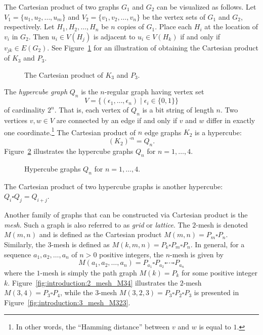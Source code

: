 The Cartesian product of two graphs $G_1$ and $G_2$ can be visualized
as follows. Let $V_1 = \{u_1, u_2, \dots, u_m\}$ and
$V_2 = \{v_1, v_2, \dots, v_n\}$ be the vertex sets of $G_1$ and
$G_2$, respectively. Let $H_1, H_2, \dots, H_n$ be $n$ copies of
$G_1$. Place each $H_i$ at the location of $v_i$ in $G_2$. Then
$u_i \in V(H_j)$ is adjacent to $u_i \in V(H_k)$ if and only if
$v_{jk} \in E(G_2)$. See
Figure~\ref{fig:introduction:Cartesian_product_K3_P3} for an
illustration of obtaining the Cartesian product of $K_3$ and $P_3$.

\begin{figure}[!htbp]
\centering

\caption{The Cartesian product of $K_3$ and $P_3$.}
\label{fig:introduction:Cartesian_product_K3_P3}
\end{figure}

The \emph{hypercube graph} $Q_n$ is the $n$-regular graph having
vertex set
\[
V
=
\big\{ (\epsilon_1,\dots,\epsilon_n) \;|\; \epsilon_i \in \{0,1\} \big\}
\]
of cardinality $2^n$. That is, each vertex of $Q_n$ is a bit string of
length $n$. Two vertices $v,w \in V$ are connected by an edge if and
only if $v$ and $w$ differ in exactly one coordinate.\footnote{
In other words, the ``Hamming distance'' between $v$ and $w$ is equal
to $1$.}
The Cartesian product of $n$ edge graphs $K_2$ is a hypercube:
\[
(K_2)^{\square n} = Q_n.
\]
Figure~\ref{fig:introduction:hypercube_graphs} illustrates the
hypercube graphs $Q_n$ for $n = 1,\dots,4$.

\begin{figure}[!htbp]
\centering

\caption{Hypercube graphs $Q_n$ for $n = 1,\dots,4$.}
\label{fig:introduction:hypercube_graphs}
\end{figure}

\begin{example}
The Cartesian product of two hypercube graphs is another
hypercube: $Q_i \square Q_j = Q_{i+j}$.
\end{example}

Another family of graphs that can be constructed via Cartesian product
is the \emph{mesh}. Such a graph is also referred to as \emph{grid} or
\emph{lattice}. The $2$-mesh is denoted $M(m,n)$ and is defined as the
Cartesian product $M(m,n) = P_m \square P_n$. Similarly, the $3$-mesh
is defined as $M(k,m,n) = P_k \square P_m \square P_n$. In general,
for a sequence $a_1, a_2, \dots, a_n$ of $n > 0$ positive integers,
the $n$-mesh is given by
\[
M(a_1, a_2, \dots, a_n)
=
P_{a_1} \square P_{a_2} \square \cdots \square P_{a_n}
\]
where the $1$-mesh is simply the path graph $M(k) = P_k$ for some
positive integer $k$. Figure~\ref{fig:introduction:2_mesh_M34}
illustrates the $2$-mesh $M(3,4) = P_3 \square P_4$, while the
$3$-mesh $M(3,2,3) = P_3 \square P_2 \square P_3$ is presented in
Figure~\ref{fig:introduction:3_mesh_M323}.

